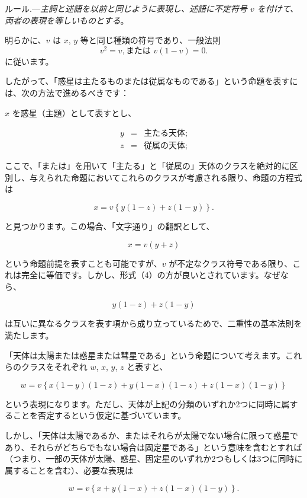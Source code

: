\documentclass[a4paper,11pt,openany]{ltjsbook}
\begin{document}
\textsc{ルール}.---\textit{主詞と述語を以前と同じように表現し、述語に不定符号 $v$ を付けて、両者の表現を等しいものとする}。

明らかに、$v$ は $x$, $y$ 等と同じ種類の符号であり、一般法則
\[
v^2 = v, \text{または } v(1 - v) = 0.
\]
に従います。

したがって、「惑星は主たるものまたは従属なものである」という命題を表すには、次の方法で進めるべきです：

$x$ を惑星（主題）として表すとし、

\begin{eqnarray*}
y &=& \text{主たる天体;}\\
z &=& \text{従属の天体;}
\end{eqnarray*}

ここで、「または」を用いて「主たる」と「従属の」天体のクラスを絶対的に区別し、与えられた命題においてこれらのクラスが考慮される限り、命題の方程式は

\begin{equation}
x = v \left\{ y (1 - z) + z (1 - y) \right\}.
\end{equation}

と見つかります。この場合、「文字通り」の翻訳として、

\begin{equation}
x = v (y + z)
\end{equation}

という命題前提を表すことも可能ですが、$v$ が不定なクラス符号である限り、これは完全に等価です。しかし、形式（4）の方が良いとされています。なぜなら、

\[
y (1 - z) + z (1 - y)
\]

は互いに異なるクラスを表す項から成り立っているためで、二重性の基本法則を満たします。

「天体は太陽または惑星または彗星である」という命題について考えます。これらのクラスをそれぞれ $w$, $x$, $y$, $z$ と表すと、

\[
w = v \left\{ x (1 - y) (1 - z) + y (1 - x) (1 - z) + z (1 - x) (1 - y) \right\}
\]

という表現になります。ただし、天体が上記の分類のいずれか2つに同時に属することを否定するという仮定に基づいています。

しかし、「天体は太陽であるか、またはそれらが太陽でない場合に限って惑星であり、それらがどちらでもない場合は固定星である」という意味を含むとすれば（つまり、一部の天体が太陽、惑星、固定星のいずれか2つもしくは3つに同時に属することを含む）、必要な表現は

\begin{equation}
w = v \left\{ x + y (1 - x) + z (1 - x) (1 - y) \right\}.
\end{equation}
\end{document}
